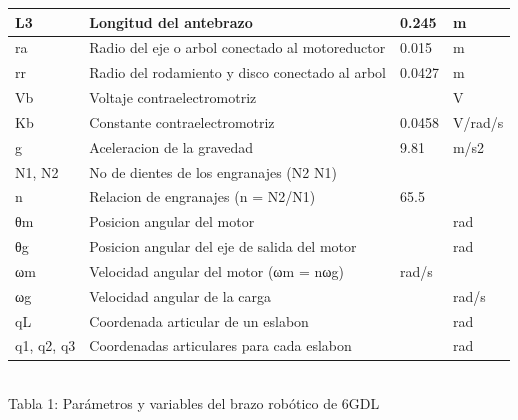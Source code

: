 \documentclass[conference]{IEEEtran}
\begin{document}
\begin{table}
\begin{tabular}{|l|l|l|l|}
\hline
L3                                        & Longitud del antebrazo                             & 0.245     & m          \\ 
\hline
ra                                        & Radio del eje o arbol conectado al motoreductor    & 0.015     & m          \\ 
\hline
rr                                        & Radio del rodamiento y disco conectado al arbol    & 0.0427    & m          \\ 
\hline
Vb                                        & Voltaje contraelectromotriz                        &        & V          \\ 
\hline
Kb                                        & Constante contraelectromotriz                      & 0.0458    & V/rad/s    \\ 
\hline
g                                         & Aceleracion de la gravedad                         & 9.81      & m/s2       \\ 
\hline
N1, N2~                                   & No de dientes de los engranajes (N2  N1)           &        &         \\ 
\hline
n                                         & Relacion de engranajes (n = N2/N1)                 & 65.5      &         \\ 
\hline
θm                                        & Posicion angular del motor                         &        & rad        \\ 
\hline
θg                                        & Posicion angular del eje de salida del motor       &        & rad        \\ 
\hline
ωm                                        & Velocidad angular del motor (ωm = nωg)             & rad/s     &         \\ 
\hline
ωg                                        & Velocidad angular de la carga                      &        & rad/s      \\ 
\hline
qL                                        & Coordenada articular de un eslabon                 &        & rad        \\ 
\hline
q1, q2, q3                                & Coordenadas articulares para cada eslabon          &        & rad        \\
\hline
\end{tabular}\\
Tabla 1: Parámetros y variables del brazo robótico de 6GDL
\end{table}
\newpage
\twocolumn
\end{document}
